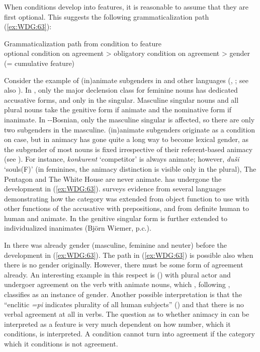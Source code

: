 \documentclass[output=collectionpaper]{langsci/langscibook}
\begin{document}
When conditions develop into features, it is reasonable to assume that they are first optional. This suggests the following grammaticalization path (\ref{ex:WDG:63}):

\ea\label{ex:WDG:63}
Grammaticalization path from condition to feature\\
optional condition on agreement > obligatory condition on agreement > gender (= cumulative feature)\\
\z

Consider the example of (in)animate subgenders in  and other  languages (\citealt[42]{Corbett1991}, \citealt*[118]{Corbett2006}; see also ). In , only the major declension class for feminine nouns has dedicated accusative forms, and only in the singular. Masculine singular nouns and all plural nouns take the genitive form if animate and the nominative form if inanimate. In --Bosnian, only the masculine singular is affected, so there are only two subgenders in the masculine.  (in)animate subgenders originate as a condition on case, but in  animacy has gone quite a long way to become lexical gender, as the subgender of most nouns is fixed irrespective of their referent-based animacy (see ). For instance, \textit{konkurent} `competitor' is always animate; however, \textit{duši} `souls(F)' (in feminines, the animacy distinction is visible only in the plural), The Pentagon and The White House are never animate.  has undergone the development in (\ref{ex:WDG:63}). \cite{Huntley1980} surveys evidence from several  languages demonstrating how the category was extended from object function to use with other functions of the accusative with prepositions, and from definite human to human and animate. In  the genitive singular form is further extended to individualized inanimates (Björn Wiemer, p.c.).

In  there was already gender (masculine, feminine and neuter) before the development in (\ref{ex:WDG:63}). The path in (\ref{ex:WDG:63}) is possible also when there is no gender originally. However, there must be some form of agreement already. An interesting example in this respect is  () with plural actor and undergoer agreement on the verb with animate nouns, which , following \cite[36--37]{Valin1977}, classifies as an instance of gender. Another possible interpretation is that the ``enclitic \textit{=pi} indicates plurality of all human subjects'' (\citealt[508]{Mithun1999}) and that there is no verbal agreement at all in  verbs. The question as to whether animacy in  can be interpreted as a feature is very much dependent on how number, which it conditions, is interpreted. A condition cannot turn into agreement if the category which it conditions is not agreement.
\end{document}
